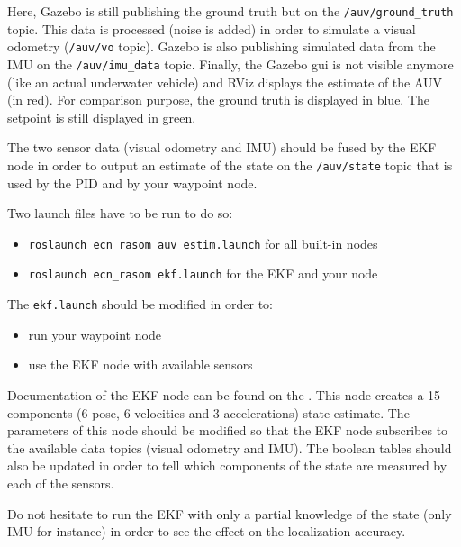 \documentclass{ecnreport}
\begin{document}
Here, Gazebo is still publishing the ground truth but on the \texttt{/auv/ground\_truth} topic. This data is processed (noise is added)
in order to simulate a visual odometry (\texttt{/auv/vo} topic). 
Gazebo is also publishing simulated data from the IMU on the \texttt{/auv/imu\_data} topic. 
Finally, the Gazebo gui is not visible anymore (like an actual underwater vehicle) and RViz displays the estimate of the AUV (in red). 
For comparison purpose, the ground truth is displayed in blue. The setpoint is still displayed in green.

The two sensor data (visual odometry and IMU) should be fused by the EKF node in order to output an estimate of the state on the \texttt{/auv/state} topic 
that is used by the PID and by your waypoint node.

Two launch files have to be run to do so:
\begin{itemize}
 \item \texttt{roslaunch ecn\_rasom auv\_estim.launch} for all built-in nodes
 \item \texttt{roslaunch ecn\_rasom ekf.launch} for the EKF and your node
\end{itemize}

The \texttt{ekf.launch} should be modified in order to:
\begin{itemize}
 \item run your waypoint node
 \item use the EKF node with available sensors
\end{itemize}
Documentation of the EKF node can be found on the .
This node creates a 15-components (6 pose, 6 velocities and 3 accelerations) state estimate.
The parameters of this node should be modified so that the EKF node
subscribes to the available data topics (visual odometry and IMU). The boolean tables should
also be updated in order to tell which components of the state are measured by each of the sensors. 

Do not hesitate to run the EKF with only a partial knowledge of the state (only IMU for instance) in order to see the effect on the localization accuracy.
\end{document}
